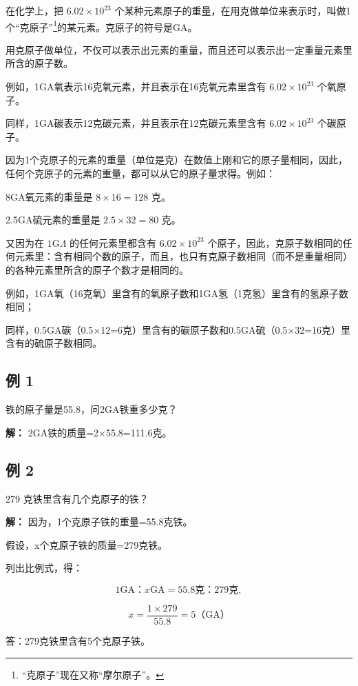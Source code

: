 在化学上，把 \(6.02 \times 10^{23}\)
个某种元素原子的重量，在用克做单位来表示时，叫做1个``克原子''\footnote{``克原子''现在又称``摩尔原子''。}的某元素。克原子的符号是GA。

用克原子做单位，不仅可以表示出元素的重量，而且还可以表示出一定重量元素里所含的原子数。

例如，1GA氧表示16克氧元素，并且表示在16克氧元素里含有
\(6.02\times10^{23}\) 个氧原子。

同样，1GA碳表示12克碳元素，并且表示在12克碳元素里含有
\(6.02\times10^{23}\) 个碳原子。

因为1个克原子的元素的重量（单位是克）在数值上刚和它的原子量相同，因此，任何个克原子的元素的重量，都可以从它的原子量求得。例如：

8GA氧元素的重量是 \(8 \times 16 = 128\) 克。

2.5GA硫元素的重量是 \(2.5 \times 32 = 80\) 克。

又因为在 \(1\mathrm{G}\Lambda\) 的任何元素里都含有
\(6.02\times 10^{23}\)
个原子，因此，克原子数相同的任何元素里：含有相同个数的原子，而且，也只有克原子数相同（而不是重量相同）的各种元素里所含的原子个数才是相同的。

例如，1GA氧（16克氧）里含有的氧原子数和1GA氢（1克氢）里含有的氢原子数相同；

同样，0.5GA碳（0.5×12=6克）里含有的碳原子数和0.5GA硫（0.5×32=16克）里含有的硫原子数相同。

\subsection{例 1}

铁的原子量是55.8，问2GA铁重多少克？

\textbf{解：} 2GA铁的质量=2×55.8=111.6克。

\subsection{例 2}

279 克铁里含有几个克原子的铁？

\textbf{解：} 因为，1个克原子铁的重量=55.8克铁。

假设，x个克原子铁的质量=279克铁。

列出比例式，得：

\[
1 \mathrm{GA}\text{：} x \mathrm{GA} = 55.8 \text{克}\text{：} 279 \text{克},
\]

\[
x=\frac{1\times279}{55.8}=5\text{（GA）}
\]

答：279克铁里含有5个克原子铁。

